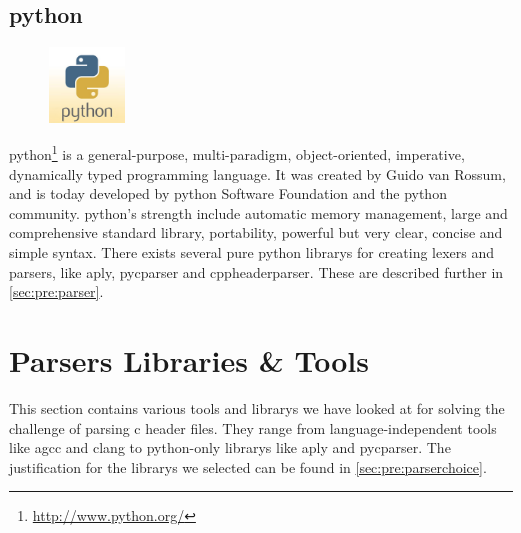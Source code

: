 \subsection{python}
\label{sec:pre:python}
\begin{figure}
	\vspace{-20pt}
	\includegraphics[width=2cm]{./planning/img/python_logo}
	\vspace{-20pt}
\end{figure}
\Gls{python}\footnote{\url{http://www.python.org/}} is a general-purpose,
multi-paradigm, object-oriented, imperative, dynamically typed programming
language. It was created by Guido van Rossum, and is today developed by \Gls{python}
Software Foundation and the \Gls{python} community. \Gls{python}’s strength include
automatic memory management, large and comprehensive standard \gls{library},
portability, powerful but very clear, concise and simple syntax.\cite{PythonORG} There exists
several pure \Gls{python} \glspl{library} for creating \glspl{lexer} and \glspl{parser}, like \gls{aply},
\gls{pycparser} and cppheaderparser. These are described further in
\autoref{sec:pre:parser}.


\section{Parsers Libraries \& Tools}
\label{sec:pre:parser}
This section contains various tools and \glspl{library} we have looked at for solving
the challenge of parsing \Gls{c} \gls{header} files. They range from language-independent
tools like \gls{agcc} and \Gls{clang} to \Gls{python}-only \glspl{library} like \Gls{aply} and \gls{pycparser}. The
justification for the \glspl{library} we selected can be found in
\autoref{sec:pre:parserchoice}.

